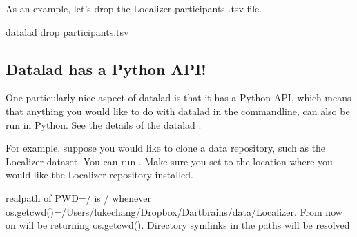 \documentclass[letterpaper,10pt,english]{sphinxmanual}
\begin{document}
As an example, let’s drop the Localizer participants .tsv file.

\begin{sphinxVerbatim}[commandchars=\\\{\}]
datalad drop participants.tsv
\end{sphinxVerbatim}

\begin{sphinxVerbatim}[commandchars=\\\{\}]

\end{sphinxVerbatim}


\subsection{Datalad has a Python API!}
\label{\detokenize{content/Download_Data:datalad-has-a-python-api}}
One particularly nice aspect of datalad is that it has a Python API, which means that anything you would like to do with datalad in the commandline, can also be run in Python. See the details of the datalad .

For example, suppose you would like to clone a data repository, such as the Localizer dataset. You can run . Make sure you set  to the location where you would like the Localizer repository installed.

\begin{sphinxVerbatim}[commandchars=\\\{\}]
 
 
   
   

  

 
\end{sphinxVerbatim}

\begin{sphinxVerbatim}[commandchars=\\\{\}]
[WARNING] realpath of PWD=/ is / whenever os.getcwd()=/Users/lukechang/Dropbox/Dartbrains/data/Localizer. From now on will be returning os.getcwd(). Directory symlinks in the paths will be resolved 
\end{sphinxVerbatim}
\end{document}
